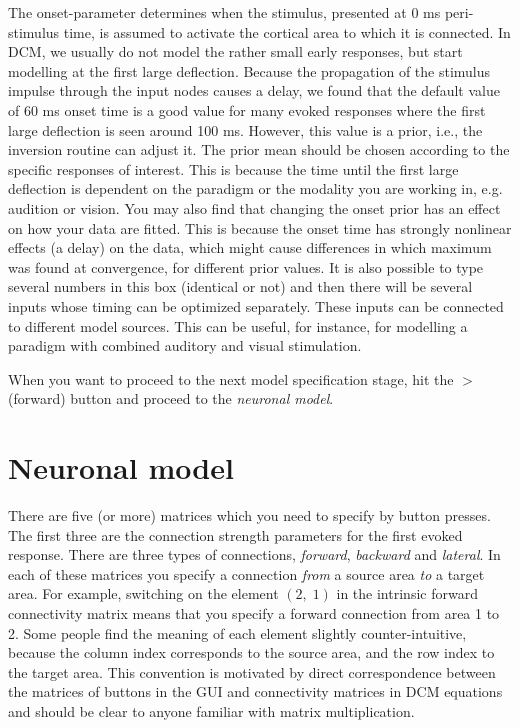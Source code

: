The onset-parameter determines when the stimulus,
presented at 0 ms peri-stimulus time, is assumed to activate the cortical area to which it is connected. In DCM, we usually do not model the rather small early responses, but start modelling at the first large
deflection. Because the propagation of the stimulus impulse through
the input nodes causes a delay, we found that the default value of 60
ms onset time is a good value for many evoked responses where the
first large deflection is seen around 100 ms. However, this value is a
prior, i.e., the inversion routine can adjust it. The prior mean should be chosen according to the specific responses of interest. This is because the time until the first large deflection is dependent on the paradigm or the modality you are working in, e.g. audition or vision.
You may also find that changing the onset prior has an effect on how your data are
fitted. This is because the onset time has strongly nonlinear effects
(a delay) on the data, which might cause differences in which maximum
was found at convergence, for different prior values. It is also possible to type several numbers in this box (identical or not) and then there will be several inputs whose timing can be optimized separately. These inputs can be connected to different model sources. This can be useful, for instance, for modelling a paradigm with combined auditory and visual stimulation.

When you want to proceed to the next model
specification stage, hit the $>$ (forward) button and proceed
to the \textit{neuronal model}.

\section{Neuronal model}
There are five (or more) matrices which you need to specify by button presses. The
first three are the connection strength parameters for the first
evoked response. There are three types of connections,
\textit{forward}, \textit{backward} and \textit{lateral}. In each of
these matrices you specify a connection \textit{from} a source area
\textit{to} a target area. For example, switching on the element
$(2,\;1)$ in the intrinsic forward connectivity matrix means that you
specify a forward connection from area 1 to 2. Some people find the
meaning of each element slightly counter-intuitive, because the
column index corresponds to the source area, and the row index to the
target area. This convention is motivated by direct correspondence between the matrices of buttons in the GUI and connectivity matrices in DCM equations and should be clear to anyone familiar with matrix multiplication.

